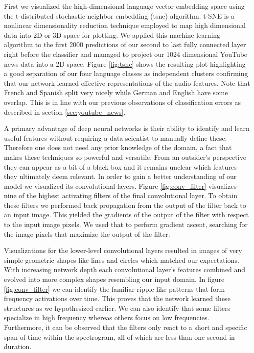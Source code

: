 First we visualized the high-dimensional language vector embedding space using the t-distributed stochastic neighbor embedding (\ac{tsne}) algorithm\cite{maaten2008visualizing}. t-SNE is a nonlinear dimensionality reduction technique employed to map high dimensional data into 2D or 3D space for plotting. We applied this machine learning algorithm to the first 2000 predictions of our second to last fully connected layer right before the classifier and managed to project our 1024 dimensional YouTube news data into a 2D space. Figure \ref{fig:tsne} shows the resulting plot highlighting a good separation of our four language classes as independent clusters confirming that our network learned effective representations of the audio features. Note that French and Spanish split very nicely while German and English have some overlap. This is in line with our previous observations of classification errors as described in section \ref{sec:youtube_news}.

A primary advantage of deep neural networks is their ability to identify and learn useful features without requiring a data scientist to manually define these. Therefore one does not need any prior knowledge of the domain, a fact that makes these techniques so powerful and versatile. From an outsider's perspective they can appear as a bit of a black box and it remains unclear which features they ultimately deem relevant. In order to gain a better understanding of our model we visualized its convolutional layers. Figure \ref{fig:conv_filter} visualizes nine of the highest activating filters of the final convolutional layer. To obtain these filters we performed back propagation from the output of the filter back to an input image. This yielded the gradients of the output of the filter with respect to the input image pixels. We used that to perform gradient ascent, searching for the image pixels that maximize the output of the filter. 

Visualizations for the lower-level convolutional layers resulted in images of very simple geometric shapes like lines and circles which matched our expectations. With increasing network depth each convolutional layer's features combined and evolved into more complex shapes resembling our input domain. In figure \ref{fig:conv_filter} we can identify the familiar ripple like patterns that form frequency activations over time. This proves that the network learned these structures as we hypothesized earlier. We can also identify that some filters specialize in high frequency whereas others focus on low frequencies. Furthermore, it can be observed that the filters only react to a short and specific span of time within the spectrogram, all of which are less than one second in duration.

